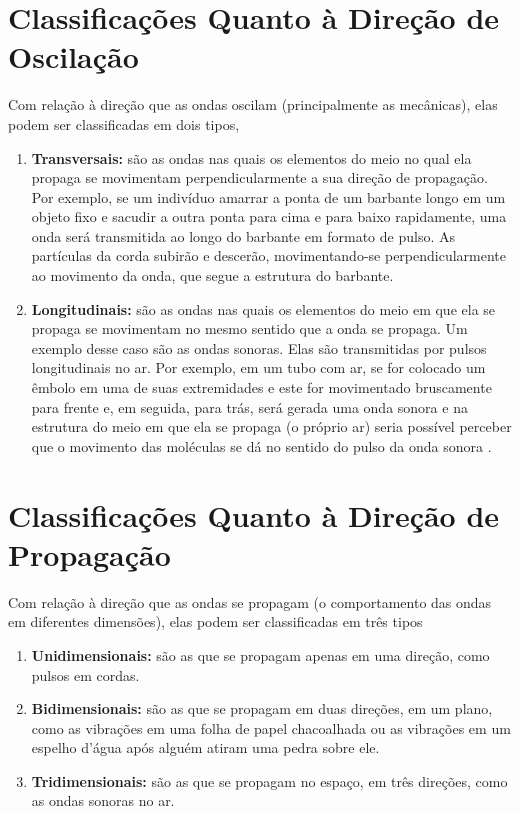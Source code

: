 	\section{Classificações Quanto à Direção de Oscilação}
		Com relação à direção que as ondas oscilam (principalmente as mecânicas), elas podem ser classificadas em dois tipos,
		\begin{enumerate}
			\item\textbf{Transversais: }são as ondas nas quais os elementos do meio no qual ela propaga	se movimentam perpendicularmente a sua direção de propagação. Por exemplo, se um indivíduo amarrar a ponta de um barbante longo em um objeto fixo e sacudir a outra ponta para cima e para baixo rapidamente, uma onda será transmitida ao longo do barbante em formato de pulso. As partículas da corda subirão e descerão, movimentando-se perpendicularmente ao movimento da onda, que segue a estrutura do barbante.
			
			\item\textbf{Longitudinais: }são as ondas nas quais os elementos do meio em que ela se propaga se movimentam no mesmo sentido que a onda se propaga. Um exemplo desse caso são as ondas sonoras. Elas são transmitidas por pulsos longitudinais no ar. Por exemplo, em um tubo com ar, se for colocado um êmbolo em uma de suas extremidades e este for movimentado bruscamente para frente e, em seguida, para trás, será gerada uma onda sonora e na estrutura do meio em que ela se propaga (o próprio ar) seria possível perceber que o movimento das moléculas se dá no sentido do pulso da onda sonora \cite{halliday}. 
			
		\end{enumerate}
	
	\section{Classificações Quanto à Direção de Propagação}
		Com relação à direção que as ondas se propagam (o comportamento das ondas em diferentes dimensões), elas podem ser classificadas em três tipos \cite{wiki:onda}
		\begin{enumerate}
			\item\textbf{Unidimensionais: }são as que se propagam apenas em uma direção, como pulsos em cordas.
			
			\item\textbf{Bidimensionais: }são as que se propagam em duas direções, em um plano, como as vibrações em uma folha de papel chacoalhada ou as vibrações em um espelho d'água após alguém atiram uma pedra sobre ele.
			
			\item\textbf{Tridimensionais: }são as que se propagam no espaço, em três direções, como as ondas sonoras no ar.
		\end{enumerate}
	
